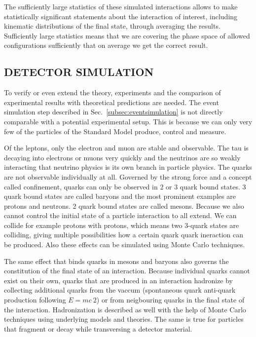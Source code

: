 \documentclass{wscpaperproc}
\theoremstyle{wsc}
\begin{document}
The sufficiently large statistics of these simulated interactions allows to make statistically significant statements about the interaction of interest, including kinematic distributions of the final state, through averaging the results. Sufficiently large statistics means that we are covering the phase space of allowed configurations sufficiently that on average we get the correct result.

\subsection{DETECTOR SIMULATION} 
\label{subsec:detectorsimulation}

To verify or even extend the theory, experiments and the comparison of experimental results with theoretical predictions are needed. The event simulation step described in Sec.~\ref{subsec:eventsimulation} is not directly comparable with a potential experimental setup. This is because we can only very few of the particles of the Standard Model produce, control and measure. 

Of the leptons, only the electron and muon are stable and observable. The tau is decaying into electrons or muons very quickly and the neutrinos are so weakly interacting that neutrino physics is its own branch in particle physics. The quarks are not observable individually at all. Governed by the strong force and a concept called confinement, quarks can only be observed in 2 or 3 quark bound states. 3 quark bound states are called baryons and the most prominent examples are protons and neutrons. 2 quark bound states are called mesons. Because we also cannot control the initial state of a particle interaction to all extend. We can collide for example protons with protons, which means two 3-quark states are colliding, giving multiple possibilities how a certain quark quark ineraction can be produced. Also these effects can be simulated using Monte Carlo techniques.

The same effect that binds quarks in mesons and baryons also governs the constitution of the final state of an interaction. Because individual quarks cannot exist on their own, quarks that are produced in an interaction hadronize by collecting additional quarks from the vaccum (spontaneous quark anti-quark production following $E=mc~2$) or from neigbouring quarks in the final state of the interaction. Hadronization is described as well with the help of Monte Carlo techniques using underlying models and theories. The same is true for particles that fragment or decay while transversing a detector material.
\end{document}
